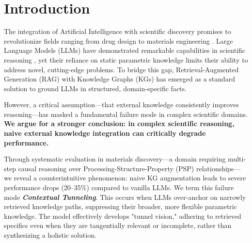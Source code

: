 \section{Introduction}
\label{sec:intro}

The integration of Artificial Intelligence with scientific discovery promises to revolutionize fields ranging from drug design to materials engineering \cite{butler_machine_2018}. Large Language Models (LLMs) have demonstrated remarkable capabilities in scientific reasoning \cite{xu2025largereasoningmodelssurvey}, yet their reliance on static parametric knowledge limits their ability to address novel, cutting-edge problems. To bridge this gap, Retrieval-Augmented Generation (RAG) with Knowledge Graphs (KGs) has emerged as a standard solution to ground LLMs in structured, domain-specific facts.

However, a critical assumption---that external knowledge consistently improves reasoning---has masked a fundamental failure mode in complex scientific domains. \textbf{We argue for a stronger conclusion: in complex scientific reasoning, naive external knowledge integration can critically degrade performance.} 

Through systematic evaluation in materials discovery---a domain requiring multi-step causal reasoning over Processing-Structure-Property (PSP) relationships---we reveal a counterintuitive phenomenon: naive KG augmentation leads to severe performance drops (20--35\%) compared to vanilla LLMs. We term this failure mode \textbf{\textit{Contextual Tunneling}}. This occurs when LLMs over-anchor on narrowly retrieved knowledge paths, suppressing their broader, more flexible parametric knowledge. The model effectively develops "tunnel vision," adhering to retrieved specifics even when they are tangentially relevant or incomplete, rather than synthesizing a holistic solution.


